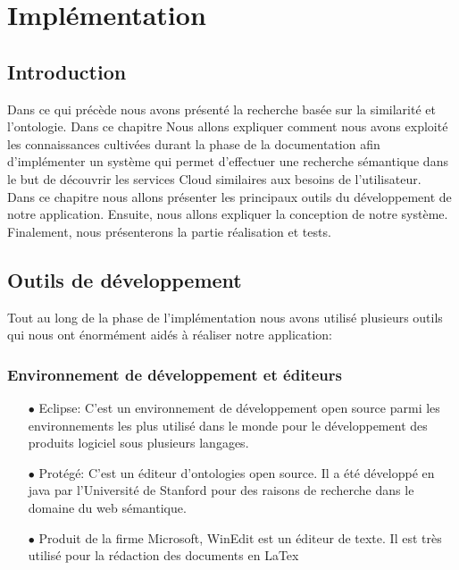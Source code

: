 \chapter{Implémentation} \label{intro}
\section{Introduction}
    Dans ce qui précède nous avons présenté  la recherche basée sur la similarité et l'ontologie. Dans ce chapitre Nous allons expliquer  comment nous avons exploité les connaissances cultivées durant la phase de la documentation afin d'implémenter un système qui permet d'effectuer une recherche sémantique dans le but de découvrir les services Cloud similaires aux besoins de l'utilisateur.\\
    Dans ce chapitre nous allons présenter les principaux outils du développement de notre application. Ensuite, nous allons expliquer la conception de notre système. Finalement, nous présenterons la partie réalisation et tests.\\

\section{Outils de développement}
    Tout au long de la phase de l'implémentation nous avons utilisé plusieurs outils qui nous ont énormément aidés à réaliser notre application:
    \subsection{Environnement de développement et éditeurs}
        \begin{itemize}
            \item[\quad $\bullet$] Eclipse: C'est un environnement de développement open source parmi les environnements les  plus utilisé dans le monde pour le développement des produits logiciel sous plusieurs langages.
            \item[\quad $\bullet$] Protégé: C'est un éditeur d'ontologies open source. Il a été développé en java par l'Université de Stanford pour des raisons de recherche dans le domaine du web sémantique.
            \item[\quad $\bullet$] Produit de la firme Microsoft, WinEdit est un éditeur de texte. Il est très utilisé pour la rédaction des documents en LaTex
        \end{itemize}
